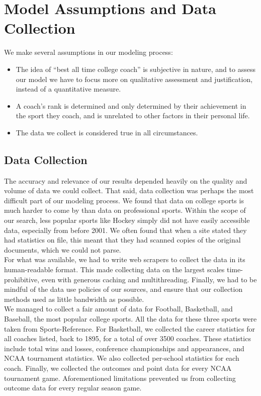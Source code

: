 \documentclass[11pt,notitlepage]{article}
\begin{document}
\section{Model Assumptions and Data Collection}
We make several assumptions in our modeling process:
\begin{itemize}
\item The idea of ``best all time college coach'' is subjective in nature, and to assess our model we have to focus more on qualitative assessment and justification, instead of a quantitative measure.

\item A coach's rank is determined and only determined by their achievement in the sport they coach, and is unrelated to other factors in their personal life.

\item The data we collect is considered true in all circumstances.
\end{itemize}

\subsection{Data Collection}
The accuracy and relevance of our results depended heavily on the quality and volume of data we could collect. That said, data collection was perhaps the most difficult part of our modeling process. We found that data on college sports is much harder to come by than data on professional sports. Within the scope of our search, less popular sports like Hockey simply did not have easily accessible data, especially from before 2001. We often found that when a site stated they had statistics on file, this meant that they had scanned copies of the original documents, which we could not parse.
\\

\noindent For what was available, we had to write web scrapers to collect the data in its human-readable format. This made collecting data on the largest scales time-prohibitive, even with generous caching and multithreading. Finally, we had to be mindful of the data use policies of our sources, and ensure that our collection methods used as little bandwidth as possible.
\\

\noindent We managed to collect a fair amount of data for Football, Basketball, and Baseball, the most popular college sports. All the data for these three sports were taken from Sports-Reference. \cite{SRDATA} For Basketball, we collected the career statistics for all coaches listed, back to 1895, for a total of over 3500 coaches. These statistics include total wins and losses, conference championships and appearances, and NCAA tournament statistics. We also collected per-school statistics for each coach. Finally, we collected the outcomes and point data for every NCAA tournament game. Aforementioned limitations prevented us from collecting outcome data for every regular season game. 
\\
\end{document}
